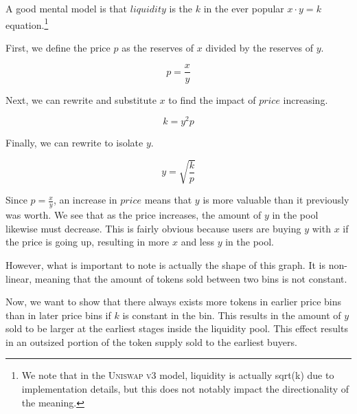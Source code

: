 \documentclass[sigconf,nonacm,prologue,table]{acmart}
\numberwithin{equation}{section}
\theoremstyle{definition}
\theoremstyle{remark}
\begin{document}
A good mental model is that $liquidity$ is the $k$ in the ever popular $x\cdot y=k$ equation.\footnote{We note that in the \textsc{Uniswap v3} model, liquidity is actually sqrt(k) due to implementation details, but this does not notably impact the directionality of the meaning.}  

First, we define the price $p$ as the reserves of $x$ divided by the reserves of $y$.

\begin{equation}
   p = \frac{x}{y}
\end{equation}

Next, we can rewrite and substitute $x$ to find the impact of $price$ increasing.

\begin{equation}
   k = y^2p
\end{equation}

Finally, we can rewrite to isolate $y$. 

\begin{equation}
  y = \sqrt{\frac{k}{p}}
\end{equation}

Since $p = \frac{x}{y}$, an increase in $price$ means that $y$ is more valuable than it previously was worth. We see that as the price increases, the amount of $y$ in the pool likewise must decrease. This is fairly obvious because users are buying $y$ with $x$ if the price is going up, resulting in more $x$ and less $y$ in the pool.


However, what is important to note is actually the shape of this graph. It is non-linear, meaning that the amount of tokens sold between two bins is not constant.

Now, we want to show that there always exists more tokens in earlier price bins than in later price bins if $k$ is constant in the bin. This results in the amount of $y$ sold to be larger at the earliest stages inside the liquidity pool. This effect results in an outsized portion of the token supply sold to the earliest buyers. 
\end{document}
